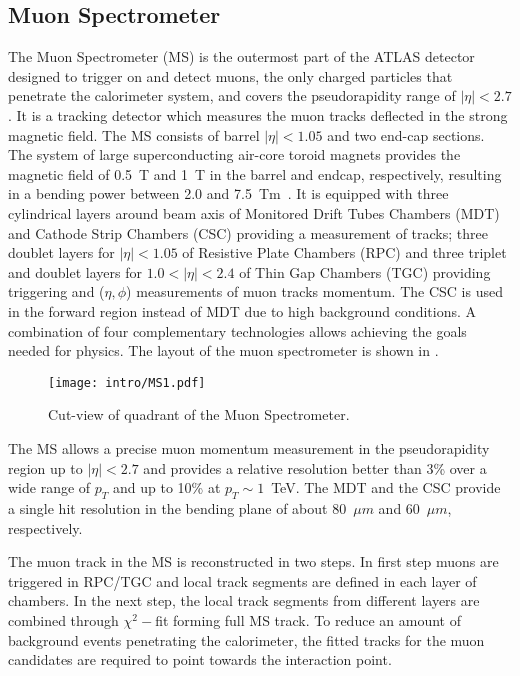 
\subsection{Muon Spectrometer}

The Muon Spectrometer (MS) is the outermost part of the ATLAS detector designed to trigger on and detect muons, the only charged particles that penetrate the calorimeter system, and covers the pseudorapidity range of $|\eta|<2.7$. It is a tracking detector which measures the muon tracks deflected in the strong magnetic field. The MS consists of barrel $|\eta|<1.05$ and two end-cap sections. The system of large superconducting air-core toroid magnets provides the magnetic field of 0.5~T and 1~T in the barrel and endcap, respectively, resulting in a bending power between 2.0 and 7.5~Tm~\cite{MCPrun1}. It is equipped with three cylindrical layers around beam axis of Monitored Drift Tubes Chambers (MDT) and Cathode Strip Chambers (CSC) providing a measurement of tracks; three doublet layers for $|\eta|<1.05$ of Resistive Plate Chambers (RPC) and three triplet and doublet layers for $1.0 < |\eta| < 2.4$ of Thin Gap Chambers (TGC) providing triggering and ($\eta, \phi$) measurements of muon tracks momentum.
The CSC is used in the forward region instead of MDT due to high background conditions.
A combination of four complementary technologies allows achieving the goals needed for physics. The layout of the muon spectrometer is shown in .

\begin{figure}[h!]
\centering
 \texttt{[image: intro/MS1.pdf]}
 \caption{Cut-view of quadrant of the Muon Spectrometer.}
\label{fig:MS}
\end{figure}

The MS allows a precise muon momentum measurement in the pseudorapidity region up to 
$|\eta|<2.7$ and provides a relative resolution better than 3\% over a wide range of $p_T$ and up to 10\% at $p_T\sim 1$~TeV.
The MDT and the CSC provide a single hit resolution in the bending plane of about 80~$\mu m$ and 60~$\mu m$, respectively.

The muon track in the MS is reconstructed in two steps. In first step muons are triggered in RPC/TGC and local track segments are defined in each layer of chambers. In the next step, the local track segments from different layers are combined through $\chi^2-$fit forming full MS track. To reduce an amount of background events penetrating the calorimeter, the fitted tracks for the muon candidates are required to point towards the interaction point.

